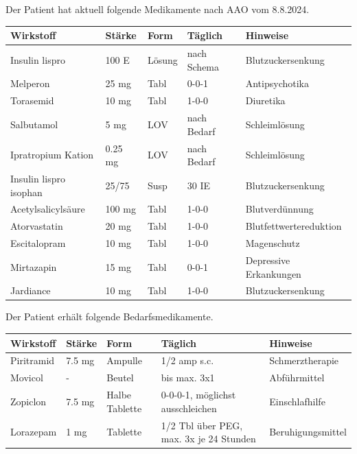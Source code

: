 \documentclass[a4paper,12pt]{article}
\begin{document}
Der Patient hat aktuell folgende Medikamente nach AAO vom 8.8.2024.

\begin{longtable}{|p{4cm}|p{2cm}|p{2cm}|p{3cm}|p{5cm}|}
	\hline
	\textbf{Wirkstoff}     & \textbf{Stärke} & \textbf{Form} & \textbf{Täglich} & \textbf{Hinweise}      \\
	\hline
	Insulin lispro         & 100 E           & Lösung        & nach Schema      & Blutzuckersenkung      \\
	\hline
	Melperon               & 25 mg           & Tabl          & 0-0-1            & Antipsychotika         \\
	\hline
	Torasemid              & 10 mg           & Tabl          & 1-0-0            & Diuretika              \\
	\hline
	Salbutamol             & 5 mg            & LOV           & nach Bedarf      & Schleimlösung          \\
	\hline
	Ipratropium Kation     & 0.25 mg         & LOV           & nach Bedarf      & Schleimlösung          \\
	\hline
	Insulin lispro isophan & 25/75           & Susp          & 30 IE            & Blutzuckersenkung      \\
	\hline
	Acetylsalicylsäure     & 100 mg          & Tabl          & 1-0-0            & Blutverdünnung         \\
	\hline
	Atorvastatin           & 20 mg           & Tabl          & 1-0-0            & Blutfettwertereduktion \\
	\hline
	Escitalopram           & 10 mg           & Tabl          & 1-0-0            & Magenschutz            \\
	\hline
	Mirtazapin             & 15 mg           & Tabl          & 0-0-1            & Depressive Erkankungen \\
	\hline
	Jardiance              & 10 mg           & Tabl          & 1-0-0            & Blutzuckersenkung      \\
	\hline
\end{longtable}

\newpage

Der Patient erhält folgende Bedarfsmedikamente.

\begin{longtable}{|p{4cm}|p{2cm}|p{2cm}|p{3cm}|p{5cm}|}
	\hline
	\textbf{Wirkstoff} & \textbf{Stärke} & \textbf{Form}  & \textbf{Täglich}                        & \textbf{Hinweise} \\
	\hline
	Piritramid         & 7.5 mg          & Ampulle        & 1/2 amp s.c.                            & Schmerztherapie   \\
	\hline
	Movicol            & -               & Beutel         & bis max. 3x1                            & Abführmittel      \\
	\hline
	Zopiclon           & 7.5 mg          & Halbe Tablette & 0-0-0-1, möglichst ausschleichen        & Einschlafhilfe    \\
	\hline
	Lorazepam          & 1 mg            & Tablette       & 1/2 Tbl über PEG, max. 3x je 24 Stunden & Beruhigungsmittel \\
	\hline
\end{longtable}
\end{document}
